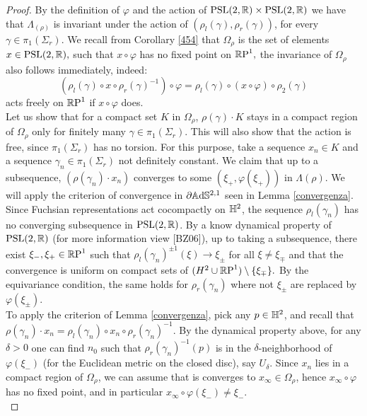 \begin{proof}
    By the definition of $\varphi$ and the action of $\PSL\times\PSL$ we have that $\Lambda_(\rho)$ is invariant under the action of $(\rho_l(\gamma),\rho_r(\gamma))$, for every $\gamma\in\pi_1(\Sigma_r).$ We recall from Corollary \ref{454} that $\Omega_\rho$ is the set of elements $x\in\PSL,$ such that $x\circ\varphi$ has no fixed point on $\S,$ the invariance of $\Omega_\rho$ also follows immediately, indeed: 
    \[
        (\rho_l(\gamma)\circ x\circ \rho_r(\gamma)^{-1})\circ \varphi = \rho_l(\gamma)\circ (x\circ\varphi)\circ\rho_2(\gamma)
    \]
    acts freely on $\S$ if $x\circ\varphi$ does. \\
    Let us show that for a compact set $K$ in $\Omega_\rho$, $\rho(\gamma)\cdot K$ stays in a compact region of $\Omega_{\rho}$ only for finitely many $\gamma\in\pi_1(\Sigma_r).$  This will also show that the action is free, since $\pi_1(\Sigma_r)$ has no torsion. For this purpose, take a sequence $x_n\in K$ and a sequence $\gamma_n\in \pi_1(\Sigma_r)$ not definitely constant. We claim that up to a subsequence, $(\rho(\gamma_n)\cdot x_n)$ converges to some $(\xi_+,\varphi(\xi_+))$ in $\Lambda(\rho).$ We will apply the criterion of convergence in $\partial\A^{2,1}$ seen in Lemma \ref{convergenza}.\\
    Since Fuchsian representations act cocompactly on $\H^2$, the sequence $\rho_l(\gamma_n)$ has no converging subsequence in $\PSL$. By a know dynamical property of $\PSL$ (for more information view [BZ06]), up to taking a subsequence, there exist $\xi_-,\xi_+\in\S$ such that $\rho_l(\gamma_n)^{\pm 1}(\xi)\to\xi_{\pm}$ for all $\xi\neq \xi_{\mp}$ and that the convergence is uniform on compact sets of $(H^2\cup\S)\setminus\{\xi_{\mp}\}.$ By the equivariance condition, the same holds for $\rho_r(\gamma_n)$ where not $\xi_\pm$ are replaced by $\varphi(\xi_\pm).$\\
    To apply the criterion of Lemma \ref{convergenza}, pick any $p\in\H^2$, and recall that $\rho(\gamma_n)\cdot x_n=\rho_l(\gamma_n)\circ x_n\circ \rho_r(\gamma_n)^{-1}.$ By the dynamical property above, for any $\delta>0$ one can find $n_0$ such that $\rho_r(\gamma_{n})^{-1}(p)$ is in the $\delta$-neighborhood of $\varphi(\xi_-)$ (for the Euclidean metric on the closed disc), say $U_\delta$. Since $x_n$ lies in a compact region of $\Omega_\rho$, we can assume that is converges to $x_\infty \in \Omega_\rho$, hence $x_\infty\circ\varphi$ has no fixed point, and in particular $x_\infty\circ\varphi(\xi_-)\neq \xi_-.$\\

\end{proof}
